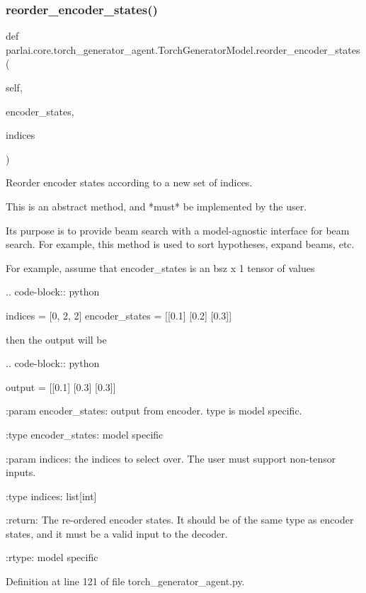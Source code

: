 \subsubsection{\texorpdfstring{reorder\+\_\+encoder\+\_\+states()}{reorder\_encoder\_states()}}
{\footnotesize\ttfamily def parlai.\+core.\+torch\+\_\+generator\+\_\+agent.\+Torch\+Generator\+Model.\+reorder\+\_\+encoder\+\_\+states (\begin{DoxyParamCaption}\item[{}]{self,  }\item[{}]{encoder\+\_\+states,  }\item[{}]{indices }\end{DoxyParamCaption})}

\begin{DoxyVerb}Reorder encoder states according to a new set of indices.

This is an abstract method, and *must* be implemented by the user.

Its purpose is to provide beam search with a model-agnostic interface for
beam search. For example, this method is used to sort hypotheses,
expand beams, etc.

For example, assume that encoder_states is an bsz x 1 tensor of values

.. code-block:: python

    indices = [0, 2, 2]
    encoder_states = [[0.1]
              [0.2]
              [0.3]]

then the output will be

.. code-block:: python

    output = [[0.1]
      [0.3]
      [0.3]]

:param encoder_states:
    output from encoder. type is model specific.

:type encoder_states:
    model specific

:param indices:
    the indices to select over. The user must support non-tensor
    inputs.

:type indices: list[int]

:return:
    The re-ordered encoder states. It should be of the same type as
    encoder states, and it must be a valid input to the decoder.

:rtype:
    model specific
\end{DoxyVerb}
 

Definition at line 121 of file torch\+\_\+generator\+\_\+agent.\+py.


